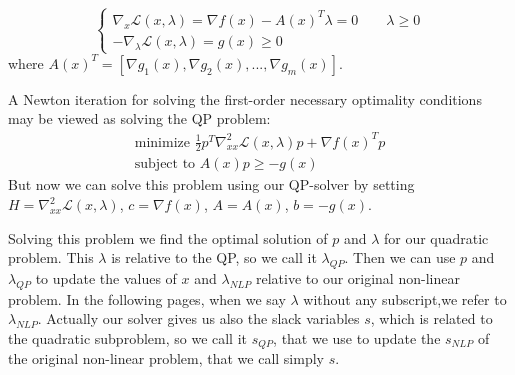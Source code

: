 \documentclass{article}
\begin{document}
\begin{equation*}
    \begin{cases}
    \nabla_x \mathcal{L}(x, \lambda) = \nabla f(x) -A(x)^T \lambda = 0 \qquad \lambda \ge 0\\
    -\nabla_\lambda \mathcal{L}(x, \lambda) = g(x) \ge 0
    \end{cases}
\end{equation*}
where $A(x)^T=[\nabla g_1(x), \nabla g_2(x),...,\nabla g_m(x)]$.




A Newton iteration for solving the first-order necessary
optimality conditions may be viewed as solving the QP
problem:
\begin{equation*}
\begin{aligned}
\textrm{minimize } \frac{1}{2} p^T\nabla^2_{xx}\mathcal{L}(x, \lambda)p + \nabla f(x)^T p \\
\textrm{subject to } A(x) p \geq -g(x)
\end{aligned}
\end{equation*}
But now we can solve this problem using our QP-solver by setting $H=\nabla^2_{xx}\mathcal{L}(x, \lambda)$, $c=\nabla f(x)$, $A=A(x)$, $b=- g(x)$.

Solving this problem we find the optimal solution of $p$ and $\lambda$ for our quadratic problem. This $\lambda$ is relative to the QP, so we call it $\lambda_{QP}$. Then we can use $p$ and $\lambda_{QP}$ to update the values of $x$ and $\lambda_{NLP}$ relative to our original non-linear problem. In the following pages, when we say $\lambda$ without any subscript,we refer to $\lambda_{NLP}$. Actually our solver gives us also the slack variables $s$, which is related to the quadratic subproblem, so we call it $s_{QP}$, that we use to update the $s_{NLP}$ of the original non-linear problem, that we call simply $s$.
\end{document}
